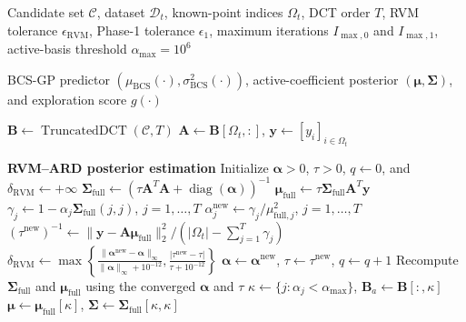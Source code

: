 \documentclass[lettersize,journal]{IEEEtran}
\newcommand{\Input}{\item[\textbf{Input:}]}
\newcommand{\Output}{\item[\textbf{Output:}]}
\begin{document}
\begin{algorithm}[!t]
\caption{BCS Module with Adaptive Uncertainty Refinement}
\label{alg:bcs_module}
\begin{algorithmic}[1]
\Input Candidate set $\mathcal{C}$, dataset $\mathcal{D}_t$, known-point indices $\Omega_t$, DCT order $T$, RVM tolerance $\epsilon_{\mathrm{RVM}}$, Phase-1 tolerance $\epsilon_1$, maximum iterations $I_{\max,0}$ and $I_{\max,1}$, active-basis threshold $\alpha_{\max}=10^6$
\Output BCS-GP predictor $(\mu_{\mathrm{BCS}}(\cdot),\sigma_{\mathrm{BCS}}^2(\cdot))$, active-coefficient posterior $(\boldsymbol{\mu},\boldsymbol{\Sigma})$, and exploration score $g(\cdot)$

\STATE $\mathbf{B}\leftarrow\operatorname{TruncatedDCT}(\mathcal{C},T)$
\STATE $\mathbf{A}\leftarrow\mathbf{B}[\Omega_t,:]$, $\mathbf{y}\leftarrow[y_i]_{i\in\Omega_t}$

\STATE \textbf{RVM--ARD posterior estimation}
\STATE Initialize $\boldsymbol{\alpha}>0$, $\tau>0$, $q\leftarrow0$, and $\delta_{\mathrm{RVM}}\leftarrow+\infty$
    \STATE $\boldsymbol{\Sigma}_{\mathrm{full}}\leftarrow\left(\tau\mathbf{A}^T\mathbf{A}+\operatorname{diag}(\boldsymbol{\alpha})\right)^{-1}$
    \STATE $\boldsymbol{\mu}_{\mathrm{full}}\leftarrow\tau\boldsymbol{\Sigma}_{\mathrm{full}}\mathbf{A}^T\mathbf{y}$
    \STATE $\gamma_j\leftarrow1-\alpha_j\boldsymbol{\Sigma}_{\mathrm{full}}(j,j)$, $j=1,\ldots,T$
    \STATE $\alpha_j^{\mathrm{new}}\leftarrow\gamma_j/\mu_{\mathrm{full},j}^2$, $j=1,\ldots,T$
    \STATE $(\tau^{\mathrm{new}})^{-1}\leftarrow\|\mathbf{y}-\mathbf{A}\boldsymbol{\mu}_{\mathrm{full}}\|_2^2/(|\Omega_t|-\sum_{j=1}^{T}\gamma_j)$
    \STATE $\delta_{\mathrm{RVM}}\leftarrow\max\left\{\frac{\|\boldsymbol{\alpha}^{\mathrm{new}}-\boldsymbol{\alpha}\|_\infty}{\|\boldsymbol{\alpha}\|_\infty+10^{-12}},\frac{|\tau^{\mathrm{new}}-\tau|}{\tau+10^{-12}}\right\}$
    \STATE $\boldsymbol{\alpha}\leftarrow\boldsymbol{\alpha}^{\mathrm{new}}$, $\tau\leftarrow\tau^{\mathrm{new}}$, $q\leftarrow q+1$
\ENDWHILE
\STATE Recompute $\boldsymbol{\Sigma}_{\mathrm{full}}$ and $\boldsymbol{\mu}_{\mathrm{full}}$ using the converged $\boldsymbol{\alpha}$ and $\tau$
\STATE $\kappa\leftarrow\{j:\alpha_j<\alpha_{\max}\}$, $\mathbf{B}_a\leftarrow\mathbf{B}[:,\kappa]$
\STATE $\boldsymbol{\mu}\leftarrow\boldsymbol{\mu}_{\mathrm{full}}[\kappa]$, $\boldsymbol{\Sigma}\leftarrow\boldsymbol{\Sigma}_{\mathrm{full}}[\kappa,\kappa]$


\end{algorithmic}
\end{algorithm}
\end{document}
